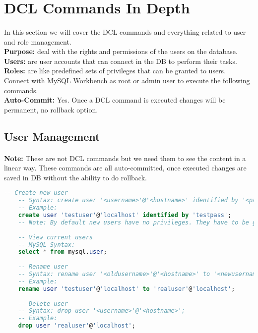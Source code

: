 
\section{\acs{DCL} Commands In Depth}
\paragraph{} In this section we will cover the \acf{DCL} commands and everything related to user and role management.\\\textbf{Purpose:} deal with the rights and permissions of the users on the database.\\\textbf{Users:} are user accounts that can connect in the \acs{DB} to perform their tasks.\\\textbf{Roles:} are like predefined sets of privileges that can be granted to users.\\Connect with MySQL Workbench as root or admin user to execute the following commands.\\\textbf{Auto-Commit:} Yes. Once a \acs{DCL} command is executed changes will be permanent, no rollback option.
\subsection{User Management}
\paragraph{} \textbf{Note:} These are not \acs{DCL} commands but we need them to see the content in a linear way. These commands are all auto-committed, once executed changes are saved in \acs{DB} without the ability to do rollback.
\begin{lstlisting}[language=SQL]
	-- Create new user
	-- Syntax: create user '<username>'@'<hostname>' identified by '<password>';
	-- Example:
	create user 'testuser'@'localhost' identified by 'testpass';
	-- Note: By default new users have no privileges. They have to be granted their privileges seperately.
	
	-- View current users
	-- MySQL Syntax:
	select * from mysql.user;
	
	-- Rename user
	-- Syntax: rename user '<oldusername>'@'<hostname>' to '<newusername>'@'<hostname>';
	-- Example:
	rename user 'testuser'@'localhost' to 'realuser'@'localhost';
	
	-- Delete user
	-- Syntax: drop user '<username>'@'<hostname>';
	-- Example:
	drop user 'realuser'@'localhost';
\end{lstlisting}
